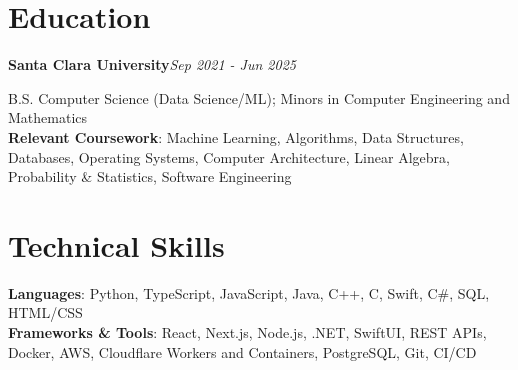 \documentclass[letterpaper,11pt]{article}
\newcommand{\eduentry}[2]{\textbf{#1}\hfill\textit{#2}\par}
\begin{document}
\section{Education}

\eduentry{Santa Clara University}{Sep 2021 - Jun 2025}
B.S. Computer Science (Data Science/ML); Minors in Computer Engineering and Mathematics\\
\textbf{Relevant Coursework}: Machine Learning, Algorithms, Data Structures, Databases, Operating Systems, Computer Architecture, Linear Algebra, Probability \& Statistics, Software Engineering

\section{Technical Skills}

\textbf{Languages}: Python, TypeScript, JavaScript, Java, C++, C, Swift, C\#, SQL, HTML/CSS\\
\textbf{Frameworks \& Tools}: React, Next.js, Node.js, .NET, SwiftUI, REST APIs, Docker, AWS, Cloudflare Workers and Containers, PostgreSQL, Git, CI/CD
\end{document}
